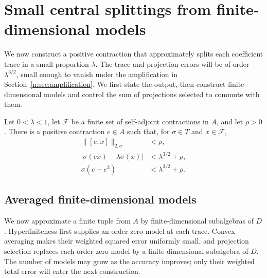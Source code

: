 \section{Small central splittings from finite-dimensional models}
\label{n:sec:small}

We now construct a positive contraction that approximately splits each
coefficient trace in a small proportion $\lambda$.  The trace and
projection errors will be of order $\lambda^{3/2}$, small enough to
vanish under the amplification in Section~\ref{n:sec:amplification}.
We first state the output, then construct finite-dimensional models and
control the sum of projections selected to commute with them.

\begin{proposition}\label{n:prop:small}
Let $0<\lambda<1$, let $\mathcal F$ be a finite set of self-adjoint
contractions in $A$, and let $\rho>0$. There is a positive contraction
$e\in A$ such that, for $\sigma\in T$ and $x\in\mathcal F$,
\begin{equation}\label{n:eq:small}
 \begin{split}
 \|[e,x]\|_{2,\sigma}&<\rho,\\
 |\sigma(ex)-\lambda\sigma(x)|&<\lambda^{3/2}+\rho,\\
 \sigma(e-e^2)&<\lambda^{3/2}+\rho.
 \end{split}
\end{equation}
\end{proposition}

\subsection{Averaged finite-dimensional models}\label{n:sec:models}

We now approximate a finite tuple from $A$ by finite-dimensional
subalgebras of $D$. Hyperfiniteness first supplies an order-zero model at
each trace. Convex averaging makes their weighted squared error uniformly
small, and projection selection replaces each order-zero model by a
finite-dimensional subalgebra of $D$. The number of models may grow as
the accuracy improves; only their weighted total error will enter the
next construction.

